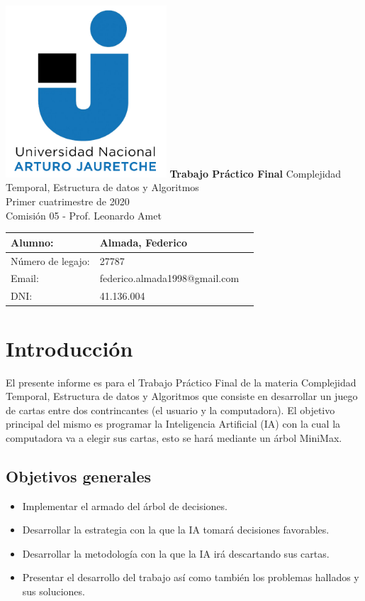 \documentclass[12pt,a4paper]{article}
\author{Federico Almada}
\begin{document}
\begin{titlepage}
	\includegraphics[width=6cm]{unaj.jpg}
    \centering
    \vfill
    \Huge \textbf{Trabajo Práctico Final}
    \vskip2cm
    \Large Complejidad Temporal, Estructura de datos y Algoritmos\\
    Primer cuatrimestre de 2020\\
    Comisión 05 - Prof. Leonardo Amet     
    \vfill
    \begin{tabular}{ | l | l | l}
      \hline
      Alumno: & Almada, Federico \\ \hline
      Número de legajo: & 27787 \\ \hline
      Email: & federico.almada1998@gmail.com \\ \hline
      DNI: & 41.136.004 \\ \hline
  	\end{tabular}
    \vfill
    \vfill
\end{titlepage}
\newpage
\tableofcontents
\newpage

\section{Introducción}
El presente informe es para el Trabajo Práctico Final de la materia Complejidad Temporal, Estructura de datos y Algoritmos que consiste en desarrollar un juego de cartas entre dos contrincantes (el usuario y la computadora). El objetivo principal del mismo es programar la Inteligencia Artificial (IA) con la cual la computadora va a elegir sus cartas, esto se hará mediante un árbol MiniMax.

\subsection{Objetivos generales}
\begin{itemize}
	\item Implementar el armado del árbol de decisiones.
	\item Desarrollar la estrategia con la que la IA tomará decisiones favorables.
	\item Desarrollar la metodología con la que la IA irá descartando sus cartas.
	\item Presentar el desarrollo del trabajo así como también los problemas hallados y sus soluciones.
\end{itemize}
\newpage
\end{document}

